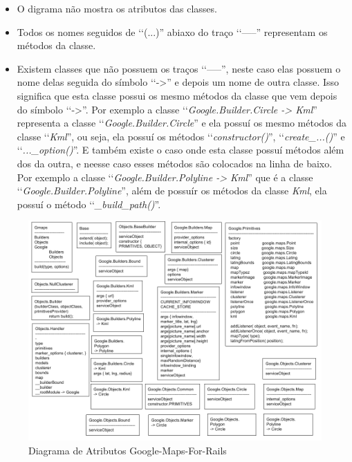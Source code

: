 \begin{itemize}

 \item O digrama não mostra os atributos das classes. 
 
 \item Todos os nomes seguidos de ‘‘(...)'' abiaxo do traço ‘‘-----'' representam os métodos da classe.
 
 \item Existem classes que não possuem os traços ‘‘-----'', neste caso elas possuem o nome delas
 seguida do símbolo ‘‘->'' e depois um nome de outra classe. Isso significa que esta classe
 possui os mesmo métodos da classe que vem depois do símbolo ‘‘->''. Por exemplo a 
 classe ‘‘\emph{Google.Builder.Circle -> Kml}'' representa a classe ‘‘\emph{Google.Builder.Circle}'' 
 e ela possuí os mesmo métodos da classe ‘‘\emph{Kml}'', ou seja, ela possuí os métodos
 ‘‘\emph{constructor()}'', ‘‘\emph{create\_...()}'' e ‘‘\emph{...\_option()}''. E também existe o caso 
 onde esta classe possuí métodos além dos da outra, e neesse caso esses métodos são colocados na linha 
 de baixo. Por exemplo a classe ‘‘\emph{Google.Builder.Polyline -> Kml}'' que é a classe 
 ‘‘\emph{Google.Builder.Polyline}'', além de possuír os métodos da classe \emph{Kml}, ela 
 possuí o método ‘‘\emph{\_build\_path()}''.
 
\end{itemize}

\begin{figure}[ht]
  \begin{center}     
    \includegraphics[scale=0.35]{images/diagrama_de_atributos_google_maps_for_rails.png}
    \caption{Diagrama de Atributos Google-Maps-For-Rails}
    \label{fig:diagrama_de_atributos_google_maps_for_rails}
  \end{center}
\end{figure}

